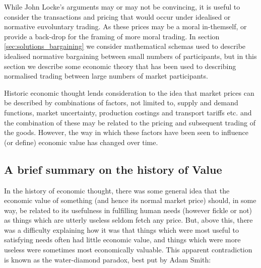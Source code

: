 While John Locke's arguments may or may not be convincing, it is useful to consider the transactions and pricing that would occur under idealised or normative euvoluntary trading.
As these prices may be a moral in-themself, or provide a back-drop for the framing of more moral trading.
In section \ref{sec:solutions_bargaining} we consider mathematical schemas used to describe idealised normative bargaining between small numbers of participants, but in this section we describe some economic theory that has been used to describing normalised trading between large numbers of market participants.

Historic economic thought lends consideration to the idea that market prices can be described by combinations of factors, not limited to, supply and demand functions, market uncertainty, production costings and transport tariffs etc. and the combination of these may be related to the pricing and subsequent trading of the goods.
However, the way in which these factors have been seen to influence (or define) economic value has changed over time.

\subsection{A brief summary on the history of Value}

In the history of economic thought, there was some general idea that the economic value of something (and hence its normal market price) should, in some way, be related to its usefulness in fulfilling human needs (however fickle or not) as things which are utterly useless seldom fetch any price.
But, above this, there was a difficulty explaining how it was that things which were most useful to satisfying needs often had little economic value, and things which were more useless were sometimes most economically valuable. This apparent contradiction is known as the water-diamond paradox, best put by Adam Smith:

